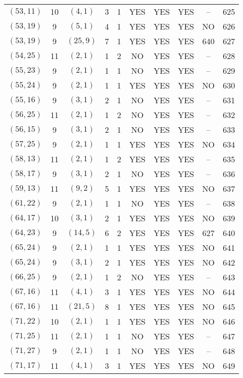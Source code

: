 \begin{longtable}{|c|c|c|c|c|c|c|c|c|c|}
$(53, 11)$ & 10 & $(4, 1)$ & 3 & 1 & YES & YES & YES & -- & 625\\
$(53, 19)$ & 9 & $(5, 1)$ & 4 & 1 & YES & YES & YES & NO & 626\\
$(53, 19)$ & 9 & $(25, 9)$ & 7 & 1 & YES & YES & YES & 640 & 627\\
$(54, 25)$ & 11 & $(2, 1)$ & 1 & 2 & NO & YES & YES & -- & 628\\
$(55, 23)$ & 9 & $(2, 1)$ & 1 & 1 & NO & YES & YES & -- & 629\\
$(55, 24)$ & 9 & $(2, 1)$ & 1 & 1 & YES & YES & YES & NO & 630\\
$(55, 16)$ & 9 & $(3, 1)$ & 2 & 1 & NO & YES & YES & -- & 631\\
$(56, 25)$ & 11 & $(2, 1)$ & 1 & 2 & NO & YES & YES & -- & 632\\
$(56, 15)$ & 9 & $(3, 1)$ & 2 & 1 & NO & YES & YES & -- & 633\\
$(57, 25)$ & 9 & $(2, 1)$ & 1 & 1 & YES & YES & YES & NO & 634\\
$(58, 13)$ & 11 & $(2, 1)$ & 1 & 2 & YES & YES & YES & -- & 635\\
$(58, 17)$ & 9 & $(3, 1)$ & 2 & 1 & NO & YES & YES & -- & 636\\
$(59, 13)$ & 11 & $(9, 2)$ & 5 & 1 & YES & YES & YES & NO & 637\\
$(61, 22)$ & 9 & $(2, 1)$ & 1 & 1 & NO & YES & YES & -- & 638\\
$(64, 17)$ & 10 & $(3, 1)$ & 2 & 1 & YES & YES & YES & NO & 639\\
$(64, 23)$ & 9 & $(14, 5)$ & 6 & 2 & YES & YES & YES & 627 & 640\\
$(65, 24)$ & 9 & $(2, 1)$ & 1 & 1 & YES & YES & YES & NO & 641\\
$(65, 24)$ & 9 & $(3, 1)$ & 2 & 1 & YES & YES & YES & NO & 642\\
$(66, 25)$ & 9 & $(2, 1)$ & 1 & 2 & NO & YES & YES & -- & 643\\
$(67, 16)$ & 11 & $(4, 1)$ & 3 & 1 & YES & YES & YES & NO & 644\\
$(67, 16)$ & 11 & $(21, 5)$ & 8 & 1 & YES & YES & YES & NO & 645\\
$(71, 22)$ & 10 & $(2, 1)$ & 1 & 1 & YES & YES & YES & NO & 646\\
$(71, 25)$ & 11 & $(2, 1)$ & 1 & 1 & NO & YES & YES & -- & 647\\
$(71, 27)$ & 9 & $(2, 1)$ & 1 & 1 & NO & YES & YES & -- & 648\\
$(71, 17)$ & 11 & $(4, 1)$ & 3 & 1 & YES & YES & YES & NO & 649\\

\end{longtable}
